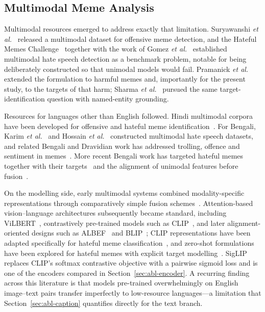 \documentclass[conference]{IEEEtran}
\begin{document}
\subsection{Multimodal Meme Analysis}

Multimodal resources emerged to address exactly that limitation. Suryawanshi
\emph{et al.}~\cite{suryawanshi2020} released a multimodal dataset for offensive
meme detection, and the Hateful Memes Challenge~\cite{kiela2020} together with
the work of Gomez \emph{et al.}~\cite{gomez2020} established multimodal hate
speech detection as a benchmark problem, notable for being deliberately
constructed so that unimodal models would fail. Pramanick \emph{et
al.}~\cite{pramanick2021a,pramanick2021b} extended the formulation to harmful
memes and, importantly for the present study, to the targets of that harm;
Sharma \emph{et al.}~\cite{sharma2022} pursued the same target-identification
question with named-entity grounding.

Resources for languages other than English followed. Hindi multimodal corpora
have been developed for offensive and hateful meme
identification~\cite{kumari2023,rajput2022}. For Bengali, Karim \emph{et
al.}~\cite{karim2022} and Hossain \emph{et al.}~\cite{hossain2022b} constructed
multimodal hate speech datasets, and related Bengali and Dravidian work has
addressed trolling, offence and sentiment in
memes~\cite{hossain2021,hossain2022c,hasan2022,hossain2022a}. More recent
Bengali work has targeted hateful memes together with their
targets~\cite{hossain2024dora} and the alignment of unimodal features before
fusion~\cite{hossain2024align}.

On the modelling side, early multimodal systems combined modality-specific
representations through comparatively simple fusion
schemes~\cite{hossain2021,hossain2022c,hasan2022}. Attention-based
vision--language architectures subsequently became standard, including
ViLBERT~\cite{lu2019}, contrastively pre-trained models such as
CLIP~\cite{radford2021}, and later alignment-oriented designs such as
ALBEF~\cite{li2021} and BLIP~\cite{li2022}; CLIP representations have been
adapted specifically for hateful meme classification~\cite{kumar2022}, and
zero-shot formulations have been explored for hateful memes with explicit target
modelling~\cite{zhu2022}. SigLIP~\cite{zhai2023} replaces CLIP's softmax
contrastive objective with a pairwise sigmoid loss and is one of the encoders
compared in Section~\ref{sec:abl-encoder}. A recurring finding across this
literature is that models pre-trained overwhelmingly on English image--text
pairs transfer imperfectly to low-resource languages---a limitation that
Section~\ref{sec:abl-caption} quantifies directly for the text branch.
\end{document}
